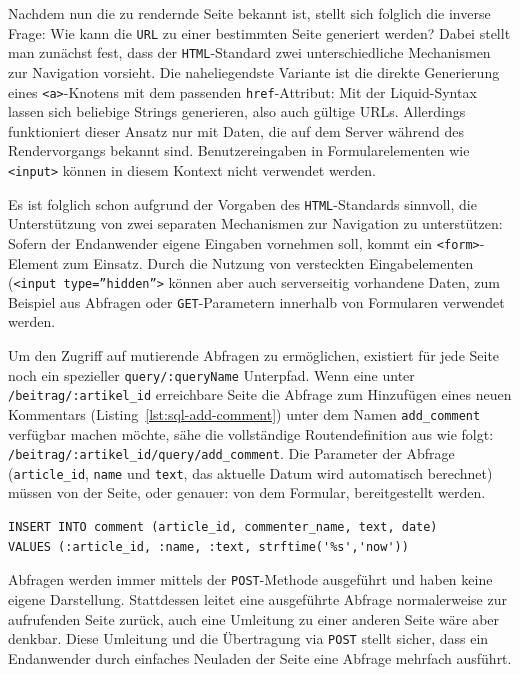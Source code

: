 Nachdem nun die zu rendernde Seite bekannt ist, stellt sich folglich die inverse Frage: Wie kann die \texttt{URL} zu einer bestimmten Seite generiert werden? Dabei stellt man zunächst fest, dass der \texttt{HTML}-Standard zwei unterschiedliche Mechanismen zur Navigation vorsieht. Die naheliegendste Variante ist die direkte Generierung eines \texttt{<a>}-Knotens mit dem passenden \texttt{href}-Attribut: Mit der Liquid-Syntax lassen sich beliebige Strings generieren, also auch gültige URLs. Allerdings funktioniert dieser Ansatz nur mit Daten, die auf dem Server während des Rendervorgangs bekannt sind. Benutzereingaben in Formularelementen wie \texttt{<input>} können in diesem Kontext nicht verwendet werden.

Es ist folglich schon aufgrund der Vorgaben des \texttt{HTML}-Standards sinnvoll, die Unterstützung von zwei separaten Mechanismen zur Navigation zu unterstützen: Sofern der Endanwender eigene Eingaben vornehmen soll, kommt ein \texttt{<form>}-Element zum Einsatz. Durch die Nutzung von versteckten Eingabelementen (\texttt{<input type=''hidden''>} können aber auch serverseitig vorhandene Daten, zum Beispiel aus Abfragen oder \texttt{GET}-Parametern innerhalb von Formularen verwendet werden.

Um den Zugriff auf mutierende Abfragen zu ermöglichen, existiert für jede Seite noch ein spezieller \texttt{query/:queryName} Unterpfad. Wenn eine unter \texttt{/beitrag/:artikel\_id} erreichbare Seite die Abfrage zum Hinzufügen eines neuen Kommentars (Listing~\ref{lst:sql-add-comment}) unter dem Namen \texttt{add\_comment} verfügbar machen möchte, sähe die vollständige Routendefinition aus wie folgt: \texttt{/beitrag/:artikel\_id/query/add\_comment}. Die Parameter der Abfrage (\texttt{article\_id}, \texttt{name} und \texttt{text}, das aktuelle Datum wird automatisch berechnet) müssen von der Seite, oder genauer: von dem Formular, bereitgestellt werden.

\begin{lstlisting}[float=h!,caption={Abfrage zum Hinzufügen eines neuen Kommentars}, label={lst:sql-add-comment}]
INSERT INTO comment (article_id, commenter_name, text, date)
VALUES (:article_id, :name, :text, strftime('%s','now'))
\end{lstlisting}

Abfragen werden immer mittels der \texttt{POST}-Methode ausgeführt und haben keine eigene Darstellung. Stattdessen leitet eine ausgeführte Abfrage normalerweise zur aufrufenden Seite zurück, auch eine Umleitung zu einer anderen Seite wäre aber denkbar. Diese Umleitung und die Übertragung via \texttt{POST} stellt sicher, dass ein Endanwender durch einfaches Neuladen der Seite eine Abfrage mehrfach ausführt.

